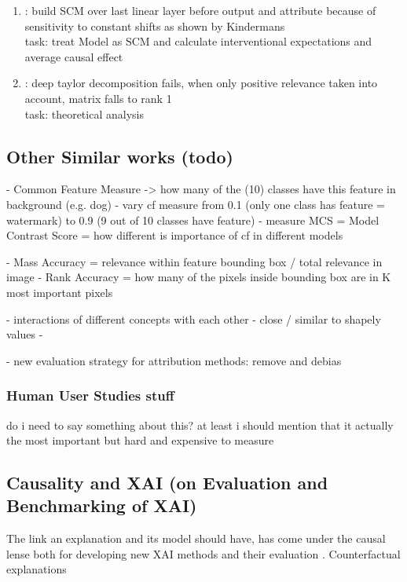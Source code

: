 \begin{enumerate}
      \item \cite{Chattopadhyay2019}: build SCM over last linear layer before output and attribute because of sensitivity to constant shifts as shown by Kindermans
            \\ task: treat Model as SCM and calculate interventional expectations and average causal effect
      \item \cite{Sixt2022}: deep taylor decomposition fails, when only positive relevance taken into account, matrix falls to rank 1 \\ task: theoretical analysis
\end{enumerate}

\subsection{Other Similar works (todo)}

\cite{Yang2019}
- Common Feature Measure -> how many of the (10) classes have this feature in background (e.g. dog)
- vary cf measure from 0.1 (only one class has feature = watermark) to 0.9 (9 out of 10 classes have feature)
- measure MCS = Model Contrast Score = how different is importance of cf in different models

\cite{Arras2022}
- Mass Accuracy = relevance within feature bounding box / total relevance in image
- Rank Accuracy = how many of the pixels inside bounding box are in K most important pixels


\cite{Bluecher2022}
- interactions of different concepts with each other
- close / similar to shapely values
-


\cite{Rong2022}
- new evaluation strategy for attribution methods: remove and debias

\subsubsection{Human User Studies stuff}
do i need to say something about this? at least i should mention that it actually the most important but hard and expensive to measure
\cite{Rong2023, }


\subsection{Causality and XAI (on Evaluation and Benchmarking of XAI)}
The link an explanation and its model should have, has come under the causal lense both for developing new XAI methods and their evaluation  . Counterfactual explanations


